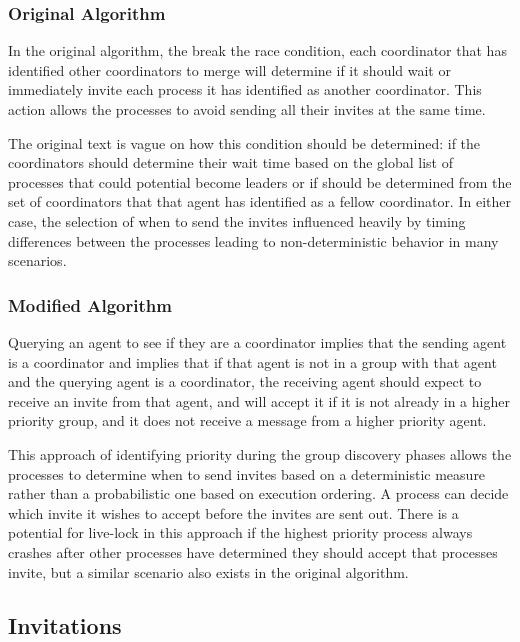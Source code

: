 \subsubsection{Original Algorithm}

In the original algorithm, the break the race condition, each coordinator that has identified other coordinators to merge will determine if it should wait or immediately invite each process it has identified as another coordinator. This action allows the processes to avoid sending all their invites at the same time.

The original text is vague on how this condition should be determined: if the coordinators should determine their wait time based on the global list of processes that could potential become leaders or if should be determined from the set of coordinators that that agent has identified as a fellow coordinator. In either case, the selection of when to send the invites influenced heavily by timing differences between the processes leading to non-deterministic behavior in many scenarios.

\subsubsection{Modified Algorithm}

Querying an agent to see if they are a coordinator implies that the sending agent is a coordinator and implies that if that agent is not in a group with that agent and the querying agent is a coordinator, the receiving agent should expect to receive an invite from that agent, and will accept it if it is not already in a higher priority group, and it does not receive a message from a higher priority agent.

This approach of identifying priority during the group discovery phases allows the processes to determine when to send invites based on a deterministic measure rather than a probabilistic one based on execution ordering. A process can decide which invite it wishes to accept before the invites are sent out. There is a potential for live-lock in this approach if the highest priority process always crashes after other processes have determined they should accept that processes invite, but a similar scenario also exists in the original algorithm.

\subsection{Invitations}

